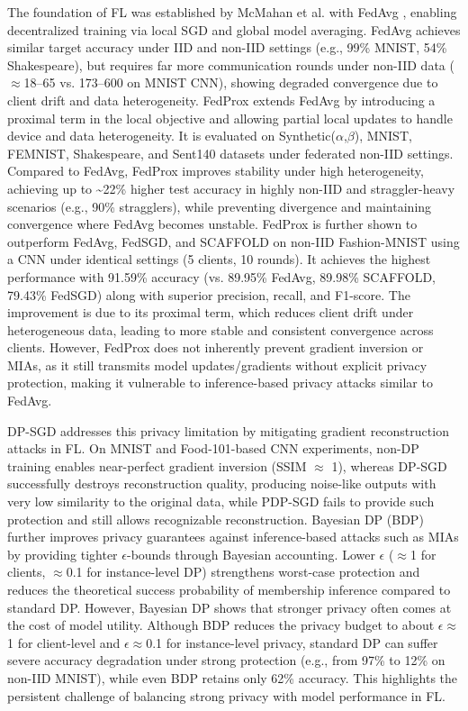 \documentclass[a4paper,fleqn]{cas-dc}
\begin{document}
The foundation of FL was established by McMahan et al. with FedAvg \citep{mcmahan2017communication}, enabling decentralized training via local SGD and global model averaging. FedAvg achieves similar target accuracy under IID and non-IID settings (e.g., 99\% MNIST, 54\% Shakespeare), but requires far more communication rounds under non-IID data ($\approx$18--65 vs. 173--600 on MNIST CNN), showing degraded convergence due to client drift and data heterogeneity. FedProx \citep{li2020federated} extends FedAvg by introducing a proximal term in the local objective and allowing partial local updates to handle device and data heterogeneity. It is evaluated on Synthetic($\alpha$,$\beta$), MNIST, FEMNIST, Shakespeare, and Sent140 datasets under federated non-IID settings. Compared to FedAvg, FedProx improves stability under high heterogeneity, achieving up to \textasciitilde22\% higher test accuracy in highly non-IID and straggler-heavy scenarios (e.g., 90\% stragglers), while preventing divergence and maintaining convergence where FedAvg becomes unstable. FedProx \citep{dai2024comparative} is further shown to outperform FedAvg, FedSGD, and SCAFFOLD on non-IID Fashion-MNIST using a CNN under identical settings (5 clients, 10 rounds). It achieves the highest performance with 91.59\% accuracy (vs. 89.95\% FedAvg, 89.98\% SCAFFOLD, 79.43\% FedSGD) along with superior precision, recall, and F1-score. The improvement is due to its proximal term, which reduces client drift under heterogeneous data, leading to more stable and consistent convergence across clients. However, FedProx does not inherently prevent gradient inversion or MIAs, as it still transmits model updates/gradients without explicit privacy protection, making it vulnerable to inference-based privacy attacks similar to FedAvg.

DP-SGD \citep{fernandez2025differential} addresses this privacy limitation by mitigating gradient reconstruction attacks in FL. On MNIST and Food-101-based CNN experiments, non-DP training enables near-perfect gradient inversion (SSIM $\approx$ 1), whereas DP-SGD successfully destroys reconstruction quality, producing noise-like outputs with very low similarity to the original data, while PDP-SGD fails to provide such protection and still allows recognizable reconstruction. Bayesian DP (BDP) \citep{nguyen2023active} further improves privacy guarantees against inference-based attacks such as MIAs by providing tighter $\epsilon$-bounds through Bayesian accounting. Lower $\epsilon$ ($\approx$1 for clients, $\approx$0.1 for instance-level DP) strengthens worst-case protection and reduces the theoretical success probability of membership inference compared to standard DP. However, Bayesian DP \citep{triastcyn2019federated} shows that stronger privacy often comes at the cost of model utility. Although BDP reduces the privacy budget to about $\epsilon$$\approx$1 for client-level and $\epsilon$$\approx$0.1 for instance-level privacy, standard DP can suffer severe accuracy degradation under strong protection (e.g., from 97\% to 12\% on non-IID MNIST), while even BDP retains only 62\% accuracy. This highlights the persistent challenge of balancing strong privacy with model performance in FL.
\end{document}

